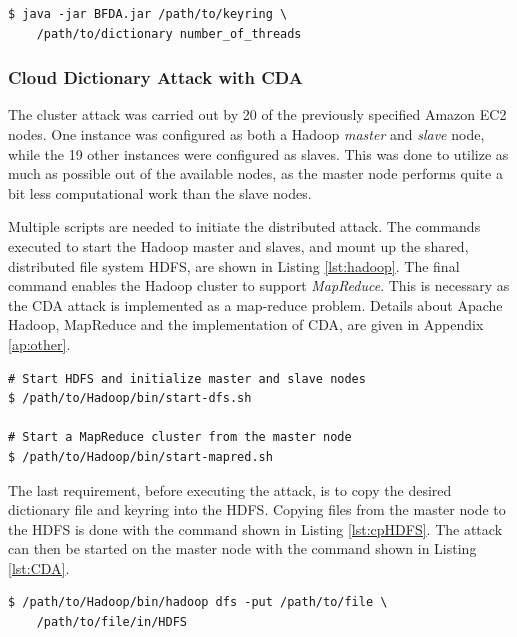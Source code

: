 \documentclass[pdftex,english,10pt,b5paper,twoside]{book}
\begin{document}
\lstset{label=lst:da, caption=Running local dictionary attack}
\begin{lstlisting}
$ java -jar BFDA.jar /path/to/keyring \
    /path/to/dictionary number_of_threads
\end{lstlisting}

\subsubsection{Cloud Dictionary Attack with \ac{CDA}}

The cluster attack was carried out by 20 of the previously specified Amazon EC2
nodes. One instance was configured as both a Hadoop \emph{master} and
\emph{slave} node, while the 19 other instances were configured as slaves.
This was done to utilize as much as possible out of the available nodes, as the
master node performs quite a bit less computational work than the slave nodes.

Multiple scripts are needed to initiate the distributed attack.
The commands executed to start the Hadoop master and slaves, and mount up the
shared, distributed file system \ac{HDFS}, are shown in Listing
\ref{lst:hadoop}. The final command enables the Hadoop cluster to support
\emph{MapReduce}. This is necessary as the \ac{CDA} attack is implemented as a
map-reduce problem. Details about Apache Hadoop, MapReduce and the
implementation of \ac{CDA}, are given in Appendix \ref{ap:other}.

\lstset{language=bash, label=lst:hadoop, caption=Starting Hadoop Cluster with HDFS}
\begin{lstlisting}
# Start HDFS and initialize master and slave nodes
$ /path/to/Hadoop/bin/start-dfs.sh

# Start a MapReduce cluster from the master node
$ /path/to/Hadoop/bin/start-mapred.sh
\end{lstlisting}

The last requirement, before executing the attack, is to copy the
desired dictionary file and keyring into the \ac{HDFS}. Copying files from the
master node to the \ac{HDFS} is done with the command shown in Listing
\ref{lst:cpHDFS}. The attack can then be started on the master node with the
command shown in Listing \ref{lst:CDA}.

\lstset{language=bash, label=lst:cpHDFS, caption=Copying files into HDFS}
\begin{lstlisting}
$ /path/to/Hadoop/bin/hadoop dfs -put /path/to/file \
    /path/to/file/in/HDFS
\end{lstlisting}
\end{document}
